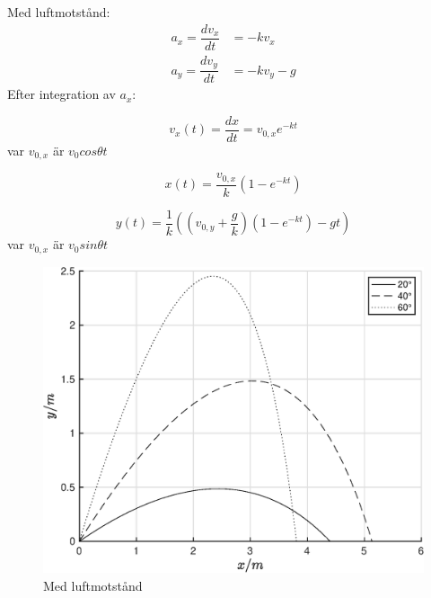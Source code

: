\np 
Med luftmotstånd: 
\begin{align}
    a_x = \dfrac{dv_x}{dt} &= -kv_x \label{eq:2b_ax}\\
    a_y = \dfrac{dv_y}{dt} &= -kv_y -g \label{eq:2b_ay}
\end{align}
Efter integration av $a_x$:

\begin{equation} \label{eq:2b_vx}
    v_x(t) = \dfrac{dx}{dt} = v_{0,x}e^{-kt}
\end{equation}
var $v_{0,x}$ är $v_0cos\theta t$

\begin{equation} \label{eq:2b_x}
    x(t) = \dfrac{v_{0,x}}{k}\left( 1-e^{-kt} \right)
\end{equation}


\begin{equation} \label{eq:2b_y}
    y(t) = \dfrac{1}{k}\left( \left(v_{0,y} + \frac{g}{k}\right)(1-e^{-kt}) -gt \right)
\end{equation}
var $v_{0,x}$ är $v_0sin\theta t$

\begin{figure}[H]
    \centering
    \captionsetup{justification=centering,margin=2cm}
    \includegraphics[scale=0.5]{Resources/Graphics/fig2_2.eps}
    \caption{Med luftmotstånd}
    \label{fig:2_2}
\end{figure}